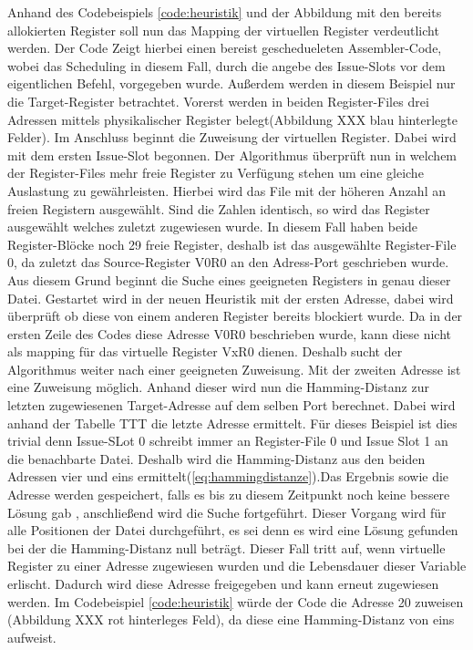 Anhand des Codebeispiels \ref{code:heuristik} und der Abbildung mit den bereits allokierten Register soll nun das Mapping der virtuellen Register verdeutlicht werden.
Der Code Zeigt hierbei einen bereist geschedueleten Assembler-Code, wobei das Scheduling in diesem Fall, durch die angebe des Issue-Slots vor dem eigentlichen Befehl, vorgegeben wurde. Außerdem werden in diesem Beispiel nur die Target-Register betrachtet.
Vorerst werden in beiden Register-Files drei Adressen mittels physikalischer Register belegt(Abbildung XXX blau hinterlegte Felder). Im Anschluss beginnt die Zuweisung der virtuellen Register.
Dabei wird mit dem ersten Issue-Slot begonnen. Der Algorithmus überprüft nun in welchem der Register-Files mehr freie Register zu Verfügung stehen um eine gleiche Auslastung zu gewährleisten. Hierbei wird das File mit der höheren Anzahl an freien Registern ausgewählt. Sind die Zahlen identisch, so wird das Register ausgewählt welches zuletzt zugewiesen wurde. In diesem Fall haben beide Register-Blöcke noch 29 freie Register, deshalb ist das ausgewählte Register-File 0, da zuletzt das Source-Register V0R0 an den Adress-Port geschrieben wurde.
Aus diesem Grund beginnt die Suche eines geeigneten Registers in genau dieser Datei. Gestartet wird in der neuen Heuristik mit der ersten Adresse, dabei wird überprüft ob diese von einem anderen Register bereits blockiert wurde. Da in der ersten Zeile des Codes diese Adresse V0R0 beschrieben wurde, kann diese nicht als mapping für das virtuelle Register VxR0 dienen. Deshalb sucht der Algorithmus weiter nach einer geeigneten Zuweisung. Mit der zweiten Adresse ist eine Zuweisung möglich. Anhand dieser wird nun die Hamming-Distanz zur letzten zugewiesenen Target-Adresse auf dem selben Port berechnet. Dabei wird anhand der Tabelle TTT die letzte Adresse ermittelt. Für dieses Beispiel ist dies trivial denn Issue-SLot 0 schreibt immer an Register-File 0 und Issue Slot 1 an die benachbarte Datei. Deshalb wird die Hamming-Distanz aus den beiden Adressen vier und eins ermittelt(\ref{eq:hammingdistanze}).Das Ergebnis sowie die Adresse werden gespeichert, falls es bis zu diesem Zeitpunkt noch keine bessere Lösung gab , anschließend wird die Suche fortgeführt. Dieser Vorgang wird für alle Positionen der Datei durchgeführt, es sei denn es wird eine Lösung gefunden bei der die Hamming-Distanz null beträgt. Dieser Fall tritt auf, wenn virtuelle Register zu einer Adresse zugewiesen wurden und die Lebensdauer dieser Variable erlischt. Dadurch wird diese Adresse freigegeben und kann erneut zugewiesen werden. Im Codebeispiel \ref{code:heuristik} würde der Code die Adresse 20 zuweisen (Abbildung XXX rot hinterleges Feld), da diese eine Hamming-Distanz von eins aufweist.
